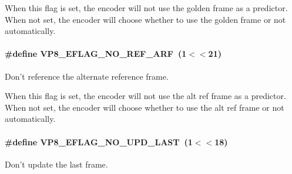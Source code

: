 \-When this flag is set, the encoder will not use the golden frame as a predictor. \-When not set, the encoder will choose whether to use the golden frame or not automatically. \hypertarget{group__vp8__encoder_ga650ab0baea12be91082226a5cc18776a}{
\paragraph[{\-V\-P8\-\_\-\-E\-F\-L\-A\-G\-\_\-\-N\-O\-\_\-\-R\-E\-F\-\_\-\-A\-R\-F}]{\setlength{\rightskip}{0pt plus 5cm}\#define {\bf \-V\-P8\-\_\-\-E\-F\-L\-A\-G\-\_\-\-N\-O\-\_\-\-R\-E\-F\-\_\-\-A\-R\-F}~(1$<$$<$21)}}\label{group__vp8__encoder_ga650ab0baea12be91082226a5cc18776a}


\-Don't reference the alternate reference frame. 

\-When this flag is set, the encoder will not use the alt ref frame as a predictor. \-When not set, the encoder will choose whether to use the alt ref frame or not automatically. \hypertarget{group__vp8__encoder_ga602edb6b02a89cb2db7a16d6dffba583}{
\paragraph[{\-V\-P8\-\_\-\-E\-F\-L\-A\-G\-\_\-\-N\-O\-\_\-\-U\-P\-D\-\_\-\-L\-A\-S\-T}]{\setlength{\rightskip}{0pt plus 5cm}\#define {\bf \-V\-P8\-\_\-\-E\-F\-L\-A\-G\-\_\-\-N\-O\-\_\-\-U\-P\-D\-\_\-\-L\-A\-S\-T}~(1$<$$<$18)}}\label{group__vp8__encoder_ga602edb6b02a89cb2db7a16d6dffba583}


\-Don't update the last frame. 

